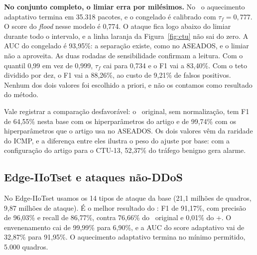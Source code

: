 \textbf{No conjunto completo, o limiar erra por milésimos.} No \modusp\ o aquecimento adaptativo
termina em 35.318 pacotes, e o congelado é calibrado com $\tau_f=0{,}777$. O score do \emph{flood}
nesse modelo é 0,774. O ataque fica logo abaixo do limiar durante todo o intervalo, e a linha
laranja da Figura~\ref{fig:ctu} não sai do zero. A AUC do congelado é 93,95\%: a separação existe,
como no ASEADOS, e o limiar não a aproveita. As duas rodadas de sensibilidade confirmam a leitura.
Com o quantil 0,99 em vez de 0,999, $\tau_f$ cai para 0,734 e o F1 vai a 83,40\%. Com o teto
dividido por dez, o F1 vai a 88,26\%, ao custo de 9,21\% de falsos positivos. Nenhum dos dois
valores foi escolhido a priori, e não os contamos como resultado do método.

Vale registrar a comparação desfavorável: o \modus\ original, sem normalização, tem F1 de 64,55\%
nesta base com os hiperparâmetros do artigo e de 99,74\% com os hiperparâmetros que o artigo usa no
ASEADOS. Os dois valores vêm da raridade do ICMP, e a diferença entre eles ilustra o peso do
ajuste por base: com a configuração do artigo para o CTU-13, 52,37\% do tráfego benigno gera alarme.

\subsection{Edge-IIoTset e ataques não-DDoS}
\label{sec:edge}
No Edge-IIoTset usamos os 14 tipos de ataque da base (21,1 milhões de quadros, 9,87 milhões de
ataque). É o melhor resultado do \modusp: F1 de 91,17\%, com precisão de 96,03\% e recall de
86,77\%, contra 76,66\% do \modus\ original e 0,01\% do \modus+. O envenenamento cai de 99,99\%
para 6,90\%, e a AUC do score adaptativo vai de 32,87\% para 91,95\%. O aquecimento adaptativo
termina no mínimo permitido, 5.000 quadros.

